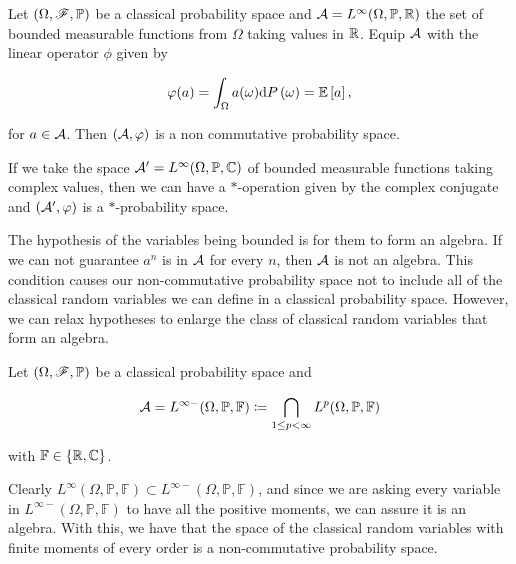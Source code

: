     \begin{example}
        Let $(\Omega, \mathscr F, \mathbb P)$ be a classical probability space and $\mathcal A = L^\infty(\Omega, \mathbb P, \mathbb R)$ the set of bounded measurable functions from $\Omega$ taking values in $\mathbb R$. Equip $\mathcal A$ with the linear operator $\phi$ given by 

        \begin{equation*}
            \varphi(a) = \int_\Omega a(\omega) \mathrm d P\left( \omega \right) = \mathbb E \left[ a \right],
        \end{equation*}

        \noindent for $a \in \mathcal A$. Then $(\mathcal A,\varphi)$ is a non commutative probability space. 

        If we take the space $\mathcal A' = L^\infty(\Omega, \mathbb P, \mathbb C)$ of bounded measurable functions taking complex values, then we can have a $*$-operation given by the complex conjugate and $(\mathcal A', \varphi)$ is a $*$-probability space.
    \end{example}

    The hypothesis of the variables being bounded is for them to form an algebra. If we can not guarantee $a^n$ is in $\mathcal A$ for every $n$, then $\mathcal A$ is not an algebra. This condition causes our non-commutative probability space not to include all of the classical random variables we can define in a classical probability space. However, we can relax hypotheses to enlarge the class of classical random variables that form an algebra.

    \begin{example}
        Let $(\Omega, \mathscr F, \mathbb P)$ be a classical probability space and 
        
        \begin{equation*}
            \mathcal A = L^{\infty-}(\Omega, \mathbb P, \mathbb F) \coloneqq \bigcap_{1\le p < \infty} L^p(\Omega, \mathbb P, \mathbb F)
        \end{equation*}
        
        \noindent with $\mathbb F \in \{\mathbb R, \mathbb C\}$. 

        Clearly $ L^{\infty}(\Omega, \mathbb P, \mathbb F) \subset  L^{\infty-}(\Omega, \mathbb P, \mathbb F)$, and since we are asking every variable in $ L^{\infty-}(\Omega, \mathbb P, \mathbb F)$ to have all the positive moments, we can assure it is an algebra. With this, we have that the space of the classical random variables with finite moments of every order is a non-commutative probability space. 
        
      
    \end{example}

